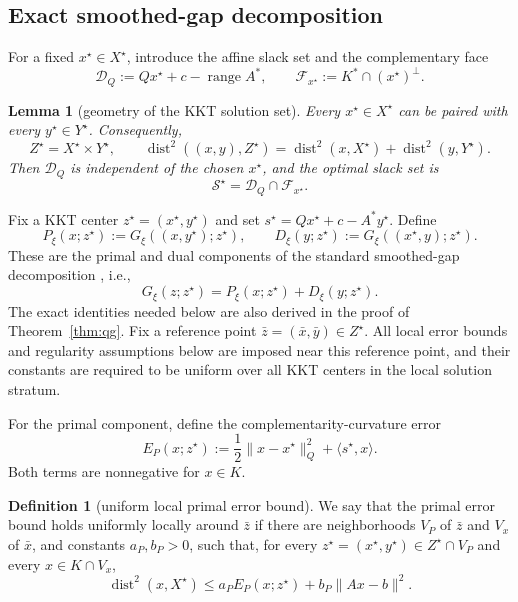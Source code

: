 \documentclass[letterpaper]{article} %
\newtheorem{lemma}[theorem]{Lemma} %
\theoremstyle{definition}
\newtheorem{definition}[theorem]{Definition}
\theoremstyle{remark}
\begin{document}
\subsection{Exact smoothed-gap decomposition}

For a fixed $x^\star\in X^\star$, introduce the affine slack set and the
complementary face
\[
    \mathcal D_Q
    :=Qx^\star+c-\operatorname{range}A^*,
    \qquad
    \mathcal F_{x^\star}
    :=K^*\cap(x^\star)^\perp.
\]

\begin{lemma}[geometry of the KKT solution set]
\label{lem:kkt-solution-geometry}
Every $x^\star\in X^\star$ can be paired with every
$y^\star\in Y^\star$.  Consequently,
\begin{equation}
\label{eq:solution-product}
    Z^\star=X^\star\times Y^\star,
    \qquad
    \operatorname{dist}^2((x,y),Z^\star)
    =
    \operatorname{dist}^2(x,X^\star)
    +
    \operatorname{dist}^2(y,Y^\star).
\end{equation}
Then $\mathcal D_Q$ is independent of the chosen $x^\star$, and the optimal
slack set is
\begin{equation}
\label{eq:optimal-slack-intersection}
    \mathcal S^\star
    =
    \mathcal D_Q\cap\mathcal F_{x^\star}.
\end{equation}
\end{lemma}

Fix a KKT center $z^\star=(x^\star,y^\star)$ and set
$s^\star=Qx^\star+c-A^*y^\star$.  Define
\[
    P_\xi(x;z^\star)
    :=
    G_\xi((x,y^\star);z^\star),
    \qquad
    D_\xi(y;z^\star)
    :=
    G_\xi((x^\star,y);z^\star).
\]
These are the primal and dual components of the standard smoothed-gap
decomposition \cite[Lemma~5]{lu2023practical}, i.e.,
$$
G_\xi(z;z^\star) = P_\xi(x;z^\star) + D_\xi(y;z^\star).
$$
The exact identities needed
below are also derived in the proof of Theorem~\ref{thm:qg}.
Fix a reference point $\bar z=(\bar x,\bar y)\in Z^\star$.  All local error
bounds and regularity assumptions below are imposed near this reference
point, and their constants are required to be uniform over all KKT centers
in the local solution stratum.

For the primal component, define the complementarity-curvature error
\begin{equation}
\label{eq:primal-curvature-error}
    E_P(x;z^\star)
    :=
    \frac12\|x-x^\star\|_Q^2+\langle s^\star,x\rangle.
\end{equation}
Both terms are nonnegative for $x\in K$.
\begin{definition}[uniform local primal error bound]
\label{def:primal-eb}
We say that the primal error bound holds uniformly locally around $\bar z$
if there are neighborhoods $V_P$ of $\bar z$ and $V_x$ of $\bar x$, and
constants $a_P,b_P>0$, such that, for every
$z^\star=(x^\star,y^\star)\in Z^\star\cap V_P$ and every
$x\in K\cap V_x$,
\begin{equation}
\label{eq:primal-eb}
    \operatorname{dist}^2(x,X^\star)
    \le
    a_PE_P(x;z^\star)
    +b_P\|Ax-b\|^2.
\end{equation}
\end{definition}
\end{document}
